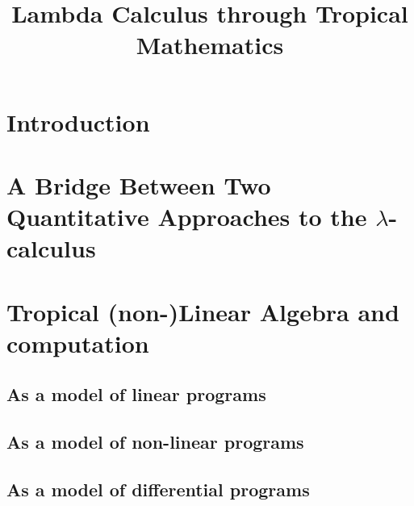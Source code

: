 \documentclass[conference]{IEEEtran}
\begin{document}
\title{Lambda Calculus through Tropical Mathematics}

\author{
\and
{}
}

\maketitle

\begin{abstract}

\end{abstract}

\begin{IEEEkeywords}
\end{IEEEkeywords}

\section{Introduction}



\section{A Bridge Between Two Quantitative Approaches to the $\lambda$-calculus}



\section{Tropical (non-)Linear Algebra and computation}

%

\subsection{As a model of linear programs}


\subsection{As a model of non-linear programs}
%

\subsection{As a model of differential programs}
%
\end{document}
